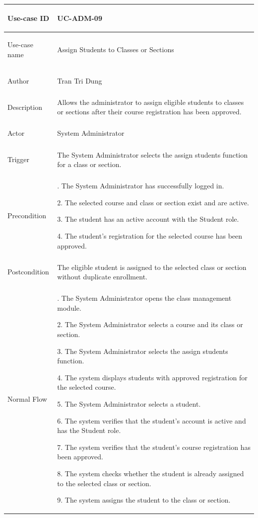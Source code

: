 \begin{longtable}{|>{\bfseries\raggedright\arraybackslash}p{}|>{\raggedright\arraybackslash}p{}|}
\hline
Use-case ID & UC-ADM-09 \\ \hline
Use-case name & Assign Students to Classes or Sections \\ \hline
Author & Tran Tri Dung \\ \hline
Description & Allows the administrator to assign eligible students to classes or sections after their course registration has been approved. \\ \hline
Actor & System Administrator \\ \hline
Trigger & The System Administrator selects the assign students function for a class or section. \\ \hline
Precondition &
1. The System Administrator has successfully logged in. \par
2. The selected course and class or section exist and are active. \par
3. The student has an active account with the Student role. \par
4. The student's registration for the selected course has been approved. \\ \hline
Postcondition & The eligible student is assigned to the selected class or section without duplicate enrollment. \\ \hline
Normal Flow &
1. The System Administrator opens the class management module. \par
2. The System Administrator selects a course and its class or section. \par
3. The System Administrator selects the assign students function. \par
4. The system displays students with approved registration for the selected course. \par
5. The System Administrator selects a student. \par
6. The system verifies that the student's account is active and has the Student role. \par
7. The system verifies that the student's course registration has been approved. \par
8. The system checks whether the student is already assigned to the selected class or section. \par
9. The system assigns the student to the class or section. \par

\end{longtable}
